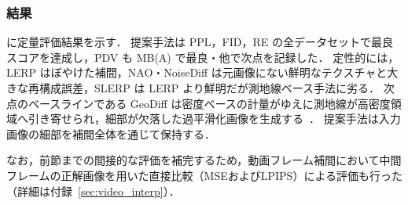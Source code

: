 \documentclass[MIRU,submit]{miru2026j}
\theoremstyle{definition}
\begin{document}
\subsubsection{結果}
 に定量評価結果を示す．
提案手法は PPL，FID，RE の全データセットで最良スコアを達成し，PDV も MB(A) で最良・他で次点を記録した．
定性的には，LERP はぼやけた補間，NAO・NoiseDiff は元画像にない鮮明なテクスチャと大きな再構成誤差，SLERP は LERP より鮮明だが測地線ベース手法に劣る．
次点のベースラインである GeoDiff は密度ベースの計量がゆえに測地線が高密度領域へ引き寄せられ，細部が欠落した過平滑化画像を生成する~\cite{Karczewski2025a}．
提案手法は入力画像の細部を補間全体を通じて保持する．

なお，前節までの間接的な評価を補完するため，動画フレーム補間において中間フレームの正解画像を用いた直接比較（MSEおよびLPIPS）による評価も行った（詳細は付録~\ref{sec:video_interp}）．
\end{document}
